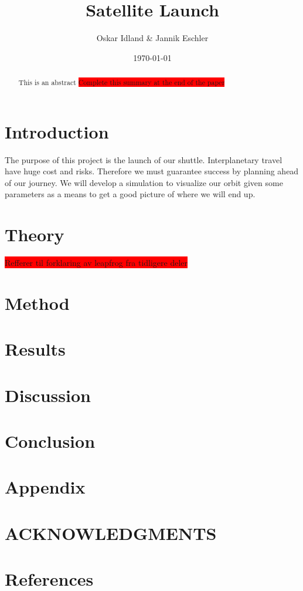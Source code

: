 \documentclass[reprint,english,notitlepage]{revtex4-2}
\begin{document}
\title{Satellite Launch}
\author{Oskar Idland \& Jannik Eschler}
\date{\today}

\begin{abstract}
    This is an abstract \colorbox{red}{Complete this summary at the end of the paper}
\end{abstract}
\maketitle

\section{Introduction} \label{sec:introduction}
The purpose of this project is the launch of our shuttle. Interplanetary travel have huge cost and risks. Therefore we must guarantee success by planning ahead of our journey. We will develop a simulation to visualize our orbit given some parameters as a means to get a good picture of where we will end up. 

\section{Theory} \label{sec: theory}
\colorbox{red}{Refferer til forklaring av leapfrog fra tidligere deler}

\section{Method} \label{sec: method}



\section{Results} \label{sec: results}

\section{Discussion} \label{sec: discussion}

\section{Conclusion} \label{sec: conclusion}

\section{Appendix} \label{sec: appendix}

\section*{ACKNOWLEDGMENTS}

\section*{References} \label{sec: references}
\end{document}

